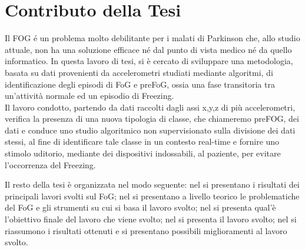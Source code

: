 \section{Contributo della Tesi}\label{cap1:Contributo della Tesi}
Il FOG é un problema molto debilitante per i malati di Parkinson che, allo studio attuale, non ha una soluzione efficace né dal punto di vista medico né da quello informatico. In questa lavoro di tesi, si è cercato di sviluppare una metodologia, basata su dati provenienti da accelerometri studiati mediante algoritmi, di identificazione degli episodi di FoG e preFoG, ossia una fase transitoria tra un'attività normale ed un episodio di Freezing.\\
Il lavoro condotto, partendo da dati raccolti dagli assi x,y,z di più accelerometri, verifica la presenza di una nuova tipologia di classe, che chiameremo preFOG, dei dati e conduce uno studio algoritmico non supervisionato sulla divisione dei dati stessi, al fine di identificare tale classe in un contesto real-time e fornire uno stimolo uditorio, mediante dei dispositivi indossabili, al paziente, per evitare l'occorrenza del Freezing.


Il resto della tesi è organizzata nel modo seguente: nel \textbf{} si presentano i risultati dei principali lavori svolti sul FoG; nel \textbf{} si presentano a livello teorico le problematiche del FoG e gli strumenti su cui si basa il lavoro svolto; nel \textbf{} si presenta qual'è l'obiettivo finale del lavoro che viene svolto; nel \textbf{} si presenta il lavoro svolto; nel \textbf{} si riassumono i risultati ottenuti e si presentano possibili miglioramenti al lavoro svolto.
 